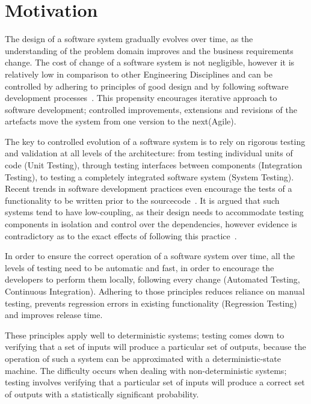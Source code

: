 \section{Motivation}
The design of a software system gradually evolves over time, as the understanding of the problem domain improves and the business requirements change. The cost of change of a software system is not negligible, however it is relatively low in comparison to other Engineering Disciplines and can be controlled by adhering to principles of good design and by following software development processes~\cite{Gof1995}. This propensity encourages iterative approach to software development; controlled improvements, extensions and revisions of the artefacts move the system from one version to the next(Agile). 

The key to controlled evolution of a software system is to rely on rigorous testing and validation at all levels of the architecture: from testing individual units of code (Unit Testing), through testing interfaces between components (Integration Testing), to testing a completely integrated software system (System Testing). Recent trends in software development practices even encourage the tests of a functionality to be written prior to the sourcecode~\cite{Beck2001}. It is argued that such systems tend to have low-coupling, as their design needs to accommodate testing components in isolation and control over the dependencies, however evidence is contradictory as to the exact effects of following this practice~\cite{Siniaalto2007}.

In order to ensure the correct operation of a software system over time, all the levels of testing need to be automatic and fast, in order to encourage the developers to perform them locally, following every change (Automated Testing, Continuous Integration). Adhering to those principles reduces reliance on manual testing, prevents regression errors in existing functionality (Regression Testing) and improves release time.

These principles apply well to deterministic systems; testing comes down to verifying that a set of inputs will produce a particular set of outputs, because the operation of such a system can be approximated with a deterministic-state machine. The difficulty occurs when dealing with non-deterministic systems; testing involves verifying that a particular set of inputs will produce a correct set of outputs with a statistically significant probability.

